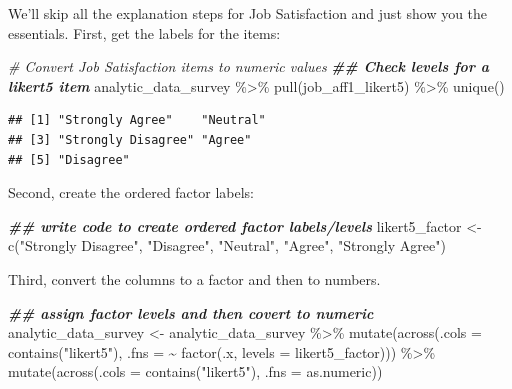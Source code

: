 \documentclass[
]{krantz}
\makeatletter
\newenvironment{Shaded}{\begin{snugshade}}{\end{snugshade}}
\newcommand{\AttributeTok}[1]{\textcolor[rgb]{0.61,0.61,0.61}{#1}}
\newcommand{\CommentTok}[1]{\textcolor[rgb]{0.37,0.37,0.37}{\textit{#1}}}
\newcommand{\DocumentationTok}[1]{\textcolor[rgb]{0.37,0.37,0.37}{\textbf{\textit{#1}}}}
\newcommand{\FunctionTok}[1]{\textcolor[rgb]{0,0,0}{#1}}
\newcommand{\NormalTok}[1]{#1}
\newcommand{\OtherTok}[1]{\textcolor[rgb]{0.37,0.37,0.37}{#1}}
\newcommand{\SpecialCharTok}[1]{\textcolor[rgb]{0,0,0}{#1}}
\newcommand{\StringTok}[1]{\textcolor[rgb]{0.5,0.5,0.5}{#1}}
\newenvironment{kframe}{%
\medskip{}
\setlength{\fboxsep}{.8em}
 \def\at@end@of@kframe{}%
 \ifinner\ifhmode%
  \def\at@end@of@kframe{\end{minipage}}%
  \begin{minipage}{\columnwidth}%
 \fi\fi%
 \def\FrameCommand##1{\hskip\@totalleftmargin \hskip-\fboxsep
 \colorbox{shadecolor}{##1}\hskip-\fboxsep
     \hskip-\linewidth \hskip-\@totalleftmargin \hskip\columnwidth}%
 \MakeFramed {\advance\hsize-\width
   \@totalleftmargin\z@ \linewidth\hsize
   \@setminipage}}%
 {\par\unskip\endMakeFramed%
 \at@end@of@kframe}
\renewenvironment{Shaded}{\begin{kframe}}{\end{kframe}}
\makeatother
\begin{document}
We'll skip all the explanation steps for Job Satisfaction and just show you the essentials. First, get the labels for the items:

\begin{Shaded}
\begin{Highlighting}[]
\CommentTok{\# Convert Job Satisfaction items to numeric  values}
\DocumentationTok{\#\# Check levels for a likert5 item}
\NormalTok{analytic\_data\_survey }\SpecialCharTok{\%\textgreater{}\%}
  \FunctionTok{pull}\NormalTok{(job\_aff1\_likert5) }\SpecialCharTok{\%\textgreater{}\%}
  \FunctionTok{unique}\NormalTok{()}
\end{Highlighting}
\end{Shaded}

\begin{verbatim}
## [1] "Strongly Agree"    "Neutral"          
## [3] "Strongly Disagree" "Agree"            
## [5] "Disagree"
\end{verbatim}

Second, create the ordered factor labels:

\begin{Shaded}
\begin{Highlighting}[]
\DocumentationTok{\#\# write code to create ordered factor labels/levels}
\NormalTok{likert5\_factor }\OtherTok{\textless{}{-}} \FunctionTok{c}\NormalTok{(}\StringTok{"Strongly Disagree"}\NormalTok{,}
                    \StringTok{"Disagree"}\NormalTok{,}
                    \StringTok{"Neutral"}\NormalTok{,}
                    \StringTok{"Agree"}\NormalTok{,}
                    \StringTok{"Strongly Agree"}\NormalTok{)}
\end{Highlighting}
\end{Shaded}

Third, convert the columns to a factor and then to numbers.

\begin{Shaded}
\begin{Highlighting}[]
\DocumentationTok{\#\# assign factor levels and then covert to numeric}
\NormalTok{analytic\_data\_survey }\OtherTok{\textless{}{-}}\NormalTok{ analytic\_data\_survey }\SpecialCharTok{\%\textgreater{}\%}
  \FunctionTok{mutate}\NormalTok{(}\FunctionTok{across}\NormalTok{(}\AttributeTok{.cols =} \FunctionTok{contains}\NormalTok{(}\StringTok{"likert5"}\NormalTok{), }
                \AttributeTok{.fns =} \SpecialCharTok{\textasciitilde{}} \FunctionTok{factor}\NormalTok{(.x, }\AttributeTok{levels =}\NormalTok{ likert5\_factor))) }\SpecialCharTok{\%\textgreater{}\%}
  \FunctionTok{mutate}\NormalTok{(}\FunctionTok{across}\NormalTok{(}\AttributeTok{.cols =} \FunctionTok{contains}\NormalTok{(}\StringTok{"likert5"}\NormalTok{), }
                \AttributeTok{.fns =}\NormalTok{ as.numeric))}
\end{Highlighting}
\end{Shaded}
\end{document}

